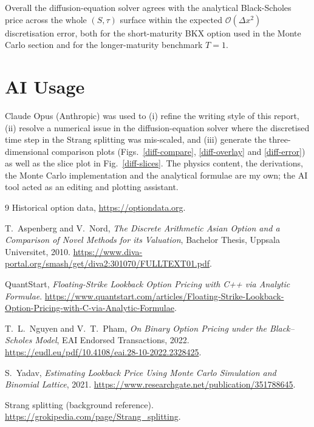 \documentclass[11pt]{article}
\begin{document}
Overall the diffusion-equation solver agrees with the analytical Black-Scholes price across the whole $(S,\tau)$ surface within the expected $\mathcal{O}(\Delta x^{2})$ discretisation error, both for the short-maturity BKX option used in the Monte Carlo section and for the longer-maturity benchmark $T=1$.

\clearpage
\section*{AI Usage}
Claude Opus (Anthropic) was used to (i) refine the writing style of this report, (ii) resolve a numerical issue in the diffusion-equation solver where the discretised time step in the Strang splitting was mis-scaled, and (iii) generate the three-dimensional comparison plots (Figs.~\ref{diff-compare}, \ref{diff-overlay} and \ref{diff-error}) as well as the slice plot in Fig.~\ref{diff-slices}. The physics content, the derivations, the Monte Carlo implementation and the analytical formulae are my own; the AI tool acted as an editing and plotting assistant.

\clearpage
\begin{thebibliography}{9}
    Historical option data,
    \url{https://optiondata.org}.

    T.~Aspenberg and V.~Nord,
    \emph{The Discrete Arithmetic Asian Option and a Comparison of Novel Methods for its Valuation},
    Bachelor Thesis, Uppsala Universitet, 2010.
    \url{https://www.diva-portal.org/smash/get/diva2:301070/FULLTEXT01.pdf}.

    QuantStart,
    \emph{Floating-Strike Lookback Option Pricing with C++ via Analytic Formulae}.
    \url{https://www.quantstart.com/articles/Floating-Strike-Lookback-Option-Pricing-with-C-via-Analytic-Formulae}.

    T.~L.~Nguyen and V.~T.~Pham,
    \emph{On Binary Option Pricing under the Black--Scholes Model},
    EAI Endorsed Transactions, 2022.
    \url{https://eudl.eu/pdf/10.4108/eai.28-10-2022.2328425}.

    S.~Yadav,
    \emph{Estimating Lookback Price Using Monte Carlo Simulation and Binomial Lattice}, 2021.
    \url{https://www.researchgate.net/publication/351788645}.

    Strang splitting (background reference).
    \url{https://grokipedia.com/page/Strang_splitting}.
\end{thebibliography}
\end{document}
